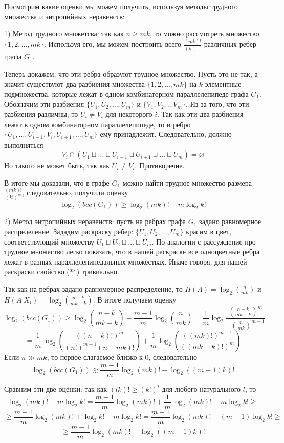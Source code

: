 \documentclass[a4paper]{article}
\begin{document}
Посмотрим какие оценки мы можем получить, используя методы трудного множества и энтропийных неравенств:

1) Метод трудного множетсва: так как $n \geq mk$, то можно рассмотреть множество $\{1, 2,\ldots, mk\}$. 
Используя его, мы можем построить всего $\frac{(mk)!}{(k!)^m}$ различных ребер графа $G_1$.

Теперь докажем, что эти ребра образуют трудное множество. Пусть это не так, а значит существуют два разбиения 
множества $\{1, 2,\ldots, mk\}$ на $k$-элементные подмножества, которые лежат в одном 
комбинаторном параллелепипеде графа $G_1$. Обозначим эти разбиения $\{U_1, U_2, \ldots, U_m\}$ и 
$\{V_1, V_2, \ldots V_m\}$. Из-за того, что эти разбиения различны, то $U_i \neq V_i$ для некоторого $i$. 
Так как эти два разбиения лежат в одном комбинаторном параллелепипеде, то и ребро 
$\{U_1, \ldots, U_{i-1}, V_i, U_{i+1}, \ldots, U_m\}$ ему принадлежит. Следовательно, должно выполняться 
$$V_i \cap (U_1\sqcup \ldots\sqcup U_{i-1}\sqcup U_{i+1}\sqcup \ldots\sqcup U_m) = \varnothing$$ Но такого 
не может быть, так как $U_i \neq V_i$. Противоречие.

В итоге мы доказали, что в графе $G_1$ можно найти трудное множество размера $\frac{(mk)!}{(k!)^m}$, 
следовательно, получили оценку $$\log_2(bcc(G_1)) \geq \log_2(mk)! - m \log_2k!$$

2) Метод энтропийных неравенств: пусть на ребрах графа $G_1$ задано равномерное распределение. 
Зададим раскраску ребер: $\{U_1, U_2, \ldots, U_m\}$ красим в цвет, соответствующий множеству 
$U_1\sqcup U_2\sqcup \ldots\sqcup U_m$. По аналогии с рассуждение про трудное множество легко показать, 
что в нашей раскраске все одноцветные ребра лежат в разных параллелепипедальных множествах. 
Иначе говоря, для нашей раскраски свойство (**) тривиально. 

Так как на ребрах задано равномерное распределение, то $H(A) = \log_2\binom{n}{mk}$ и $H(A|X_i) = \log_2\binom{n-k}{mk-k}$. 
В итоге получаем оценку $$\log_2(bcc(G_1)) \geq \log_2\binom{n-k}{mk-k} - \frac{m-1}{m}\log_2\binom{n}{mk} =
\frac{1}{m}\log_2\frac{\binom{n-k}{mk-k}^{m}}{\ \ \ \binom{n}{mk}^{m-1}} = $$ $$ = \frac{1}{m}\log_2
\left(\frac{((n-k)!)^m}{(n!)^{m-1}(n-mk)!}\right) + \frac{1}{m}\log_2\left(\frac{((mk)!)^{m-1}}{((mk-k)!)^{m}}\right)$$
Если $n\gg mk$, то первое слагаемое близко к 0, следовательно $$\log_2(bcc(G_1)) \gtrsim \frac{m-1}{m}\log_2(mk)! - \log_2((m-1)k)!$$

Сравним эти две оценки: так как $(lk)! \geq (k!)^{l}$ для любого натурального $l$, то 
$$\log_2(mk)! - m \log_2k! = \frac{m-1}{m}\log_2(mk)! + \frac{1}{m}\log_2(mk)! - m \log_2k! \geq $$
$$ \geq \frac{m-1}{m}\log_2(mk)! + \log_2k! - m \log_2k! = \frac{m-1}{m}\log_2(mk)! - (m-1)\log_2k! \geq$$
$$ \geq \frac{m-1}{m}\log_2(mk)! - \log_2((m-1)k)!$$
\end{document}
